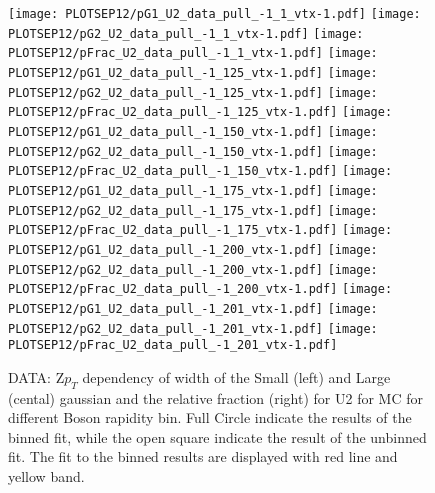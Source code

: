 \documentclass[41pt,a4paper,oneside]{report}
\begin{document}
\begin{figure}[h!]
  \begin{center}
    \texttt{[image: PLOTSEP12/pG1\_U2\_data\_pull\_-1\_1\_vtx-1.pdf]}
    \texttt{[image: PLOTSEP12/pG2\_U2\_data\_pull\_-1\_1\_vtx-1.pdf]}
    \texttt{[image: PLOTSEP12/pFrac\_U2\_data\_pull\_-1\_1\_vtx-1.pdf]} 
    \texttt{[image: PLOTSEP12/pG1\_U2\_data\_pull\_-1\_125\_vtx-1.pdf]}
    \texttt{[image: PLOTSEP12/pG2\_U2\_data\_pull\_-1\_125\_vtx-1.pdf]}
    \texttt{[image: PLOTSEP12/pFrac\_U2\_data\_pull\_-1\_125\_vtx-1.pdf]} 
    \texttt{[image: PLOTSEP12/pG1\_U2\_data\_pull\_-1\_150\_vtx-1.pdf]}
    \texttt{[image: PLOTSEP12/pG2\_U2\_data\_pull\_-1\_150\_vtx-1.pdf]}
    \texttt{[image: PLOTSEP12/pFrac\_U2\_data\_pull\_-1\_150\_vtx-1.pdf]} 
    \texttt{[image: PLOTSEP12/pG1\_U2\_data\_pull\_-1\_175\_vtx-1.pdf]}
    \texttt{[image: PLOTSEP12/pG2\_U2\_data\_pull\_-1\_175\_vtx-1.pdf]}
    \texttt{[image: PLOTSEP12/pFrac\_U2\_data\_pull\_-1\_175\_vtx-1.pdf]} 
    \texttt{[image: PLOTSEP12/pG1\_U2\_data\_pull\_-1\_200\_vtx-1.pdf]}
    \texttt{[image: PLOTSEP12/pG2\_U2\_data\_pull\_-1\_200\_vtx-1.pdf]}
    \texttt{[image: PLOTSEP12/pFrac\_U2\_data\_pull\_-1\_200\_vtx-1.pdf]} 
    \texttt{[image: PLOTSEP12/pG1\_U2\_data\_pull\_-1\_201\_vtx-1.pdf]}
    \texttt{[image: PLOTSEP12/pG2\_U2\_data\_pull\_-1\_201\_vtx-1.pdf]}
    \texttt{[image: PLOTSEP12/pFrac\_U2\_data\_pull\_-1\_201\_vtx-1.pdf]} 
    \caption{DATA: Z$p_{T}$ dependency of width of the Small (left) and Large (cental) gaussian and the relative fraction (right) for U2 for MC for different Boson rapidity bin. Full Circle indicate the results of the binned fit, while the open square indicate the result of the unbinned fit. The fit to the binned results are displayed with red line and yellow band. 
\newline
}
    \label{fig:SmallLargeU2DATA}
  \end{center}
\end{figure}
\end{document}
